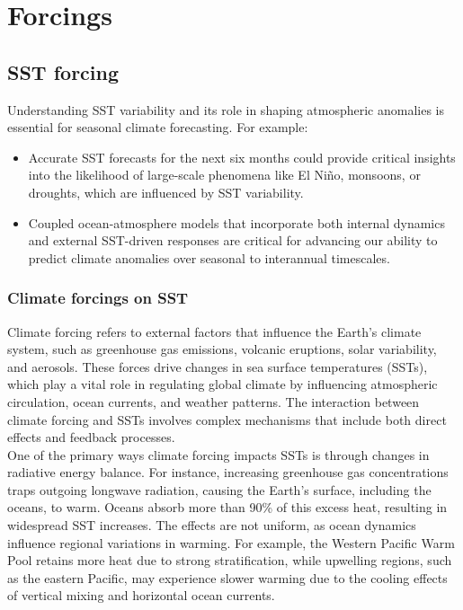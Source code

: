 \chapter{Forcings}

\section{SST forcing}
Understanding SST variability and its role in shaping atmospheric anomalies is essential for seasonal climate forecasting. For example:
\begin{itemize}
	\item Accurate SST forecasts for the next six months could provide critical insights into the likelihood of large-scale phenomena like El Niño, monsoons, or droughts, which are influenced by SST variability.
	\item Coupled ocean-atmosphere models that incorporate both internal dynamics and external SST-driven responses are critical for advancing our ability to predict climate anomalies over seasonal to interannual timescales.
\end{itemize}

\subsection{Climate forcings on SST}
Climate forcing refers to external factors that influence the Earth’s climate system, such as greenhouse gas emissions, volcanic eruptions, solar variability, and aerosols. These forces drive changes in sea surface temperatures (SSTs), which play a vital role in regulating global climate by influencing atmospheric circulation, ocean currents, and weather patterns. The interaction between climate forcing and SSTs involves complex mechanisms that include both direct effects and feedback processes.\\


One of the primary ways climate forcing impacts SSTs is through changes in radiative energy balance. For instance, increasing greenhouse gas concentrations traps outgoing longwave radiation, causing the Earth’s surface, including the oceans, to warm. Oceans absorb more than 90\% of this excess heat, resulting in widespread SST increases. The effects are not uniform, as ocean dynamics influence regional variations in warming. For example, the Western Pacific Warm Pool retains more heat due to strong stratification, while upwelling regions, such as the eastern Pacific, may experience slower warming due to the cooling effects of vertical mixing and horizontal ocean currents.

